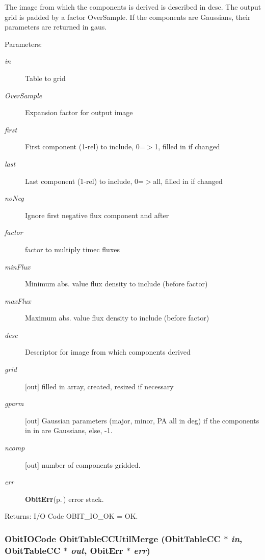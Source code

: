 The image from which the components is derived is described in desc. The output grid is padded by a factor Over\-Sample. If the components are Gaussians, their parameters are returned in gaus. \begin{Desc}
\item[Parameters:]
\begin{description}
\item[{\em in}]Table to grid \item[{\em Over\-Sample}]Expansion factor for output image \item[{\em first}]First component (1-rel) to include, 0=$>$1, filled in if changed \item[{\em last}]Last component (1-rel) to include, 0=$>$all, filled in if changed \item[{\em no\-Neg}]Ignore first negative flux component and after \item[{\em factor}]factor to multiply timec fluxes \item[{\em min\-Flux}]Minimum abs. value flux density to include (before factor) \item[{\em max\-Flux}]Maximum abs. value flux density to include (before factor) \item[{\em desc}]Descriptor for image from which components derived \item[{\em grid}][out] filled in array, created, resized if necessary \item[{\em gparm}][out] Gaussian parameters (major, minor, PA all in deg) if the components in in are Gaussians, else, -1. \item[{\em ncomp}][out] number of components gridded. \item[{\em err}]{\bf Obit\-Err}{\rm (p.\,\pageref{structObitErr})} error stack. \end{description}
\end{Desc}
\begin{Desc}
\item[Returns:]I/O Code OBIT\_\-IO\_\-OK = OK. \end{Desc}
\subsubsection{\setlength{\rightskip}{0pt plus 5cm}Obit\-IOCode Obit\-Table\-CCUtil\-Merge ({\bf Obit\-Table\-CC} $\ast$ {\em in}, {\bf Obit\-Table\-CC} $\ast$ {\em out}, {\bf Obit\-Err} $\ast$ {\em err})}\label{ObitTableCCUtil_8c_a8}


